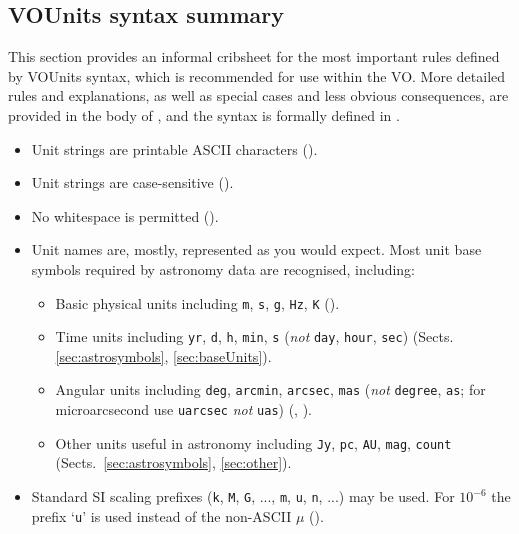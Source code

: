 \documentclass[11pt,a4paper]{ivoa}
\newcommand{\unit}[1]{\texttt{\small\color{orange}#1}}
\begin{document}
\subsection{VOUnits syntax summary\label{sec:cribsheet}}

This section provides an informal cribsheet for the most important
rules defined by VOUnits syntax, which is recommended for use
within the VO.
More detailed rules and explanations, as well as special cases
and less obvious consequences,
are provided in the body of ,
and the syntax is formally defined in .
\begin{itemize}
\item Unit strings are printable ASCII characters ().
\item Unit strings are case-sensitive ().
\item No whitespace is permitted ().
\item Unit names are, mostly, represented as you would expect.
      Most unit base symbols required by astronomy data are recognised,
      including:
  \begin{itemize}
    \item Basic physical units including
          \unit{m}, \unit{s}, \unit{g}, \unit{Hz}, \unit{K}
          ().
    \item Time units including
          \unit{yr}, \unit{d}, \unit{h}, \unit{min}, \unit{s}
          ({\em not\/} {\tt day}, {\tt hour}, {\tt sec})
          (Sects. \ref{sec:astrosymbols}, \ref{sec:baseUnits}).
    \item Angular units including
          \unit{deg}, \unit{arcmin}, \unit{arcsec}, \unit{mas}
          ({\em not\/} {\tt degree}, {\tt as};
          for microarcsecond use \unit{uarcsec} {\em not\/} {\tt uas})
          (, ).
    \item Other units useful in astronomy including
          \unit{Jy}, \unit{pc}, \unit{AU}, \unit{mag},
          \unit{count}
          (Sects.\ \ref{sec:astrosymbols}, \ref{sec:other}).
  \end{itemize}
\item Standard SI scaling prefixes
      (\unit{k}, \unit{M}, \unit{G}, ..., \unit{m}, \unit{u}, \unit{n}, ...)
      may be used.
      For $10^{-6}$ the prefix `\unit{u}'
      is used instead of the non-ASCII $\mu$
      ().

\end{itemize}
\end{document}
